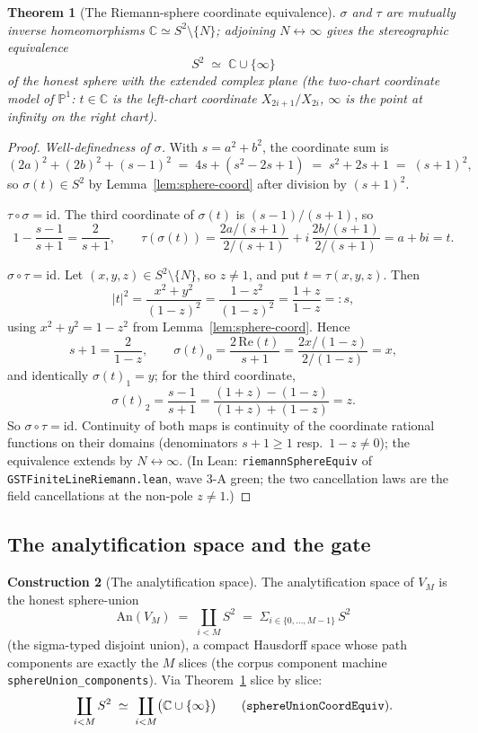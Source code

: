 \documentclass[11pt,a4paper]{article}
\theoremstyle{plain}
\newtheorem{theorem}{Theorem}[section]
\theoremstyle{definition}
\newtheorem{construction}[theorem]{Construction}
\newcommand{\C}{\mathbb{C}}
\newcommand{\PP}{\mathbb{P}}
\begin{document}
\begin{theorem}[The Riemann-sphere coordinate equivalence]
\label{thm:stereo}
$\sigma$ and $\tau$ are mutually inverse homeomorphisms $\C \simeq
S^2 \setminus \{N\}$; adjoining $N \leftrightarrow \infty$ gives the
stereographic equivalence
\[
S^2 \;\simeq\; \C \cup \{\infty\}
\]
of the honest sphere with the extended complex plane (the two-chart
coordinate model of $\PP^1$: $t \in \C$ is the left-chart coordinate
$X_{2i+1}/X_{2i}$, $\infty$ is the point at infinity on the right
chart).
\end{theorem}

\begin{proof}
\emph{Well-definedness of $\sigma$.}  With $s = a^2+b^2$, the
coordinate sum is
\[
(2a)^2 + (2b)^2 + (s-1)^2 \;=\; 4s + (s^2 - 2s + 1) \;=\; s^2 + 2s +
1 \;=\; (s+1)^2 ,
\]
so $\sigma(t) \in S^2$ by Lemma~\ref{lem:sphere-coord} after division
by $(s+1)^2$.

\emph{$\tau \circ \sigma = \mathrm{id}$.}  The third coordinate of
$\sigma(t)$ is $(s-1)/(s+1)$, so
\[
1 - \frac{s-1}{s+1} = \frac{2}{s+1}, \qquad
\tau(\sigma(t)) = \frac{2a/(s+1)}{2/(s+1)} + i\,\frac{2b/(s+1)}{2/(s+1)}
= a + bi = t .
\]

\emph{$\sigma \circ \tau = \mathrm{id}$.}  Let $(x,y,z) \in S^2
\setminus \{N\}$, so $z \ne 1$, and put $t = \tau(x,y,z)$.  Then
\[
|t|^2 = \frac{x^2+y^2}{(1-z)^2} = \frac{1-z^2}{(1-z)^2} =
\frac{1+z}{1-z} =: s,
\]
using $x^2+y^2 = 1 - z^2$ from Lemma~\ref{lem:sphere-coord}.  Hence
\[
s + 1 = \frac{2}{1-z}, \qquad
\sigma(t)_0 = \frac{2\,\mathrm{Re}(t)}{s+1} = \frac{2x/(1-z)}{2/(1-z)}
= x,
\]
and identically $\sigma(t)_1 = y$; for the third coordinate,
\[
\sigma(t)_2 = \frac{s-1}{s+1} = \frac{(1+z)-(1-z)}{(1+z)+(1-z)} = z .
\]
So $\sigma\circ\tau = \mathrm{id}$.  Continuity of both maps is
continuity of the coordinate rational functions on their domains
(denominators $s+1 \ge 1$ resp.\ $1-z \ne 0$); the equivalence
extends by $N \leftrightarrow \infty$.  (In Lean:
\texttt{riemannSphereEquiv} of \texttt{GSTFiniteLineRiemann.lean},
wave 3-A green; the two cancellation laws are the field
cancellations at the non-pole $z \ne 1$.)
\end{proof}

\subsection{The analytification space and the gate}

\begin{construction}[The analytification space]\label{con:space}
The analytification space of $V_M$ is the honest sphere-union
\[
\mathrm{An}(V_M) \;=\; \coprod_{i < M} S^2 \;=\; \Sigma_{i \in \{0,\dots,M-1\}}\, S^2
\]
(the sigma-typed disjoint union), a compact Hausdorff space whose
path components are exactly the $M$ slices (the corpus component
machine \texttt{sphereUnion\_components}).  Via
Theorem~\ref{thm:stereo} slice by slice:
\[
\coprod_{i<M} S^2 \;\simeq\; \coprod_{i<M} \bigl(\C \cup \{\infty\}\bigr)
\qquad
\text{(\texttt{sphereUnionCoordEquiv})}.
\]
\end{construction}
\end{document}

